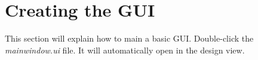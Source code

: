 \documentclass{article}
\begin{document}
\section{Creating the GUI}

This section will explain how to main a basic GUI. Double-click the \textit{mainwindow.ui} file. It will automatically open in the design view.








	
	







\end{document}

